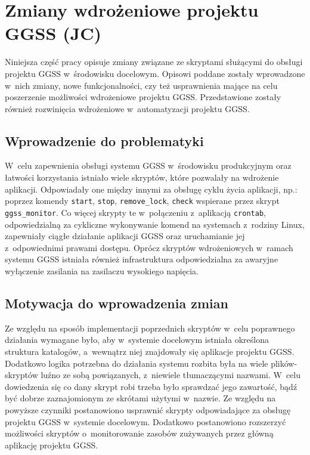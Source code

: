 \clearpage
\section{Zmiany wdrożeniowe projektu GGSS (JC)}
\label{ch:scripts}

Niniejsza część pracy opisuje zmiany związane ze skryptami służącymi do obsługi projektu GGSS w~środowisku docelowym. Opisowi poddane zostały wprowadzone w~nich zmiany, nowe funkcjonalności, czy też usprawnienia mające na celu poszerzenie możliwości wdrożeniowe projektu GGSS. Przedstawione zostały również rozwinięcia wdrożeniowe w~automatyzacji projektu GGSS.

\subsection{Wprowadzenie do problematyki}
W~celu zapewnienia obsługi systemu GGSS w~środowisku produkcyjnym oraz łatwości korzystania istniało wiele skryptów, które pozwalały na wdrożenie aplikacji. Odpowiadały one między innymi za obsługę cyklu życia aplikacji, np.: poprzez komendy \lstinline{start}, \lstinline{stop}, \lstinline{remove_lock}, \lstinline{check} wspierane przez skrypt \lstinline{ggss_monitor}. Co więcej skrypty te w~połączeniu z~aplikacją \lstinline{crontab}, odpowiedzialną za cykliczne wykonywanie komend na systemach z~rodziny Linux, zapewniały ciągłe działanie aplikacji GGSS oraz uruchamianie jej z~odpowiednimi prawami dostępu. Oprócz skryptów wdrożeniowych w~ramach systemu GGSS istniała również infrastruktura odpowiedzialna za awaryjne wyłączenie zasilania na zasilaczu wysokiego napięcia.

\subsection{Motywacja do wprowadzenia zmian}
\label{sec:scripts_motiv}
Ze względu na sposób implementacji poprzednich skryptów w~celu poprawnego działania wymagane było, aby w~systemie docelowym istniała określona struktura katalogów, a~wewnątrz niej znajdowały się aplikacje projektu GGSS. Dodatkowo logika potrzebna do działania systemu rozbita była na wiele plików-skryptów luźno ze sobą powiązanych, z~niewiele tłumaczącymi nazwami. W~celu dowiedzenia się co dany skrypt robi trzeba było sprawdzać jego zawartość, bądź być dobrze zaznajomionym ze skrótami użytymi w~nazwie. Ze względu na powyższe czynniki postanowiono usprawnić skrypty odpowiadające za obsługę projektu GGSS w~systemie docelowym. Dodatkowo postanowiono rozszerzyć możliwości skryptów o~monitorowanie zasobów zużywanych przez główną aplikację projektu GGSS.

